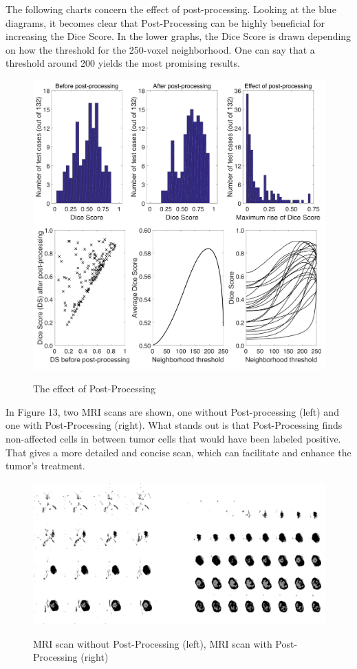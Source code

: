 \documentclass[
12pt,
headsepline,
bibliography=totoc,
twoside=semi,
fleqn
]{scrartcl}
\begin{document}
 The following charts concern the effect of post-processing. Looking at the blue diagrams, it becomes clear that Post-Processing can be highly beneficial for increasing the Dice Score. In the lower graphs, the Dice Score is drawn depending on how the threshold for the 250-voxel neighborhood. One can say that a threshold around 200 yields the most promising results. 

 \begin{figure}[H]
 \centering \includegraphics[scale=0.4]{BDT18.png}\label{fig:fig18}
 \caption{The effect of Post-Processing}
 \end{figure} 

 In Figure 13, two MRI scans are shown, one without Post-processing (left) and one with Post-Processing (right). What stands out is that Post-Processing finds non-affected cells in between tumor cells that would have been labeled positive. That gives a more detailed and concise scan, which can facilitate and enhance the tumor's treatment. 

 \begin{figure}[H]
 \centering \includegraphics[scale=0.7]{BDT19.png}\label{fig:fig19}
 \caption{MRI scan without Post-Processing (left), MRI scan with Post-Processing (right)}
 \end{figure} 
\end{document}
